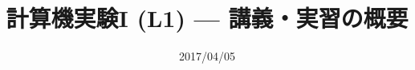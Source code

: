 \documentclass[dvipdfmx]{beamer}
\title{計算機実験I (L1) --- 講義・実習の概要}
\date{2017/04/05}
\begin{document}
\begin{frame}
  \titlepage
  \tableofcontents
\end{frame}





\end{document}
